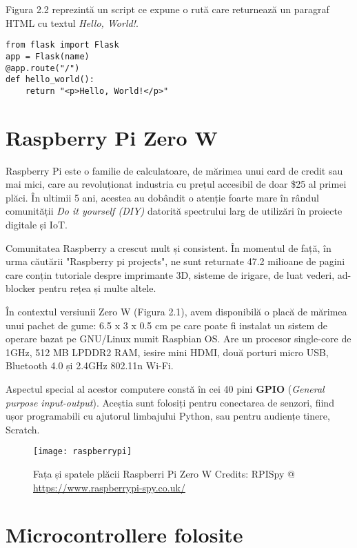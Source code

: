 Figura 2.2 reprezintă un script ce expune o rută care returnează un paragraf HTML cu textul \emph{Hello, World!}.

\begin{lstlisting}[style=python, caption=Exemplu minimal de aplicație Flask]
from flask import Flask	
app = Flask(name)
@app.route("/")
def hello_world():
	return "<p>Hello, World!</p>"
\end{lstlisting}

\section{Raspberry Pi Zero W}

Raspberry Pi este o familie de calculatoare, de mărimea unui card de credit sau mai mici, care au revoluționat industria cu prețul accesibil de doar \$25 al primei plăci. În ultimii 5 ani, acestea au dobândit o atenție foarte mare în rândul comunității \emph{Do it yourself (DIY)} datorită spectrului larg de utilizări în proiecte digitale și IoT.

Comunitatea Raspberry a crescut mult și consistent. În momentul de față, în urma căutării "Raspberry pi projects", ne sunt returnate 47.2 milioane de pagini care conțin tutoriale despre imprimante 3D, sisteme de irigare, de luat vederi, ad-blocker pentru rețea și multe altele.

În contextul versiunii Zero W (Figura 2.1), avem disponibilă o placă de mărimea unui pachet de gume: 6.5 x 3 x 0.5 cm pe care poate fi instalat un sistem de operare bazat pe GNU/Linux numit Raspbian OS. Are un procesor single-core de 1GHz, 512 MB LPDDR2 RAM, iesire mini HDMI, două porturi micro USB, Bluetooth 4.0 și 2.4GHz 802.11n Wi-Fi.

Aspectul special al acestor computere constă în cei 40 pini \textbf{GPIO} (\emph{General purpose input-output}). Aceștia sunt folosiți pentru conectarea de senzori, fiind ușor programabili cu ajutorul limbajului Python, sau pentru audiențe tinere, Scratch.


\begin{figure}[h]
	\centering
	\texttt{[image: raspberrypi]}
	\caption{Fața și spatele plăcii Raspberri Pi Zero W
		Credits: RPISpy @ \url{https://www.raspberrypi-spy.co.uk/}}
	\label{fig:raspberrypi}
\end{figure}

\break

\section{Microcontrollere folosite}

